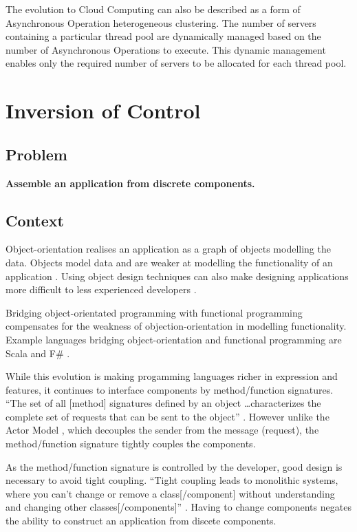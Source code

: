 \documentclass[prodmode]{style/acmlarge}
\begin{document}
The evolution to Cloud Computing can also be described as a form of Asynchronous
Operation heterogeneous clustering.  The number of servers containing a
particular thread pool are dynamically managed based on the number of
Asynchronous Operations to execute.  This dynamic management enables only the
required number of servers to be allocated for each thread pool.



\section{Inversion of Control}


\subsection{Problem}

\textbf{Assemble an application from discrete components.}


\subsection{Context}

Object-orientation realises an application as a graph of objects modelling the
data.  Objects model data and are weaker at modelling the functionality of an
application \cite{oo-behaviour}.  Using object design techniques can also make
designing applications more difficult to less experienced developers
\cite{oo-design}.

Bridging object-orientated programming with functional programming
\cite{bridging-function-oo} compensates for the weakness of
objection-orientation in modelling functionality.  Example languages bridging
object-orientation and functional programming are Scala \cite{scala} and F\#
\cite{f-sharp}.

While this evolution is making progamming languages richer in expression and
features, it continues to interface components by method/function signatures.
``The set of all [method] signatures defined by an object \ldots characterizes
the complete set of requests that can be sent to the object'' \cite[p. 13]{gof}.
 However unlike the Actor Model \cite{actors}, which decouples the sender from
the message (request), the method/function signature tightly couples the
components.

As the method/function signature is controlled by the developer, good design is
necessary to avoid tight coupling.  ``Tight coupling leads to monolithic
systems, where you can't change or remove a class[/component] without
understanding and changing other classes[/components]'' \cite[p. 24-25]{gof}.
Having to change components negates the ability to construct an application from
discete components.
\end{document}
